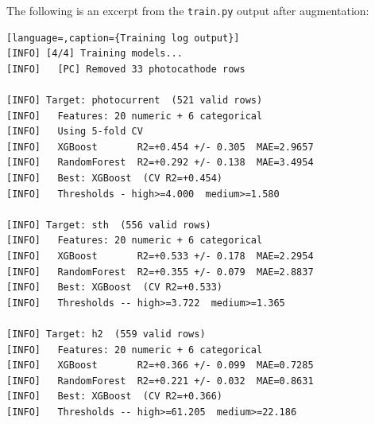 The following is an excerpt from the \texttt{train.py} output after augmentation:

\begin{lstlisting}[language=,caption={Training log output}]
[INFO] [4/4] Training models...
[INFO]   [PC] Removed 33 photocathode rows

[INFO] Target: photocurrent  (521 valid rows)
[INFO]   Features: 20 numeric + 6 categorical
[INFO]   Using 5-fold CV
[INFO]   XGBoost       R2=+0.454 +/- 0.305  MAE=2.9657
[INFO]   RandomForest  R2=+0.292 +/- 0.138  MAE=3.4954
[INFO]   Best: XGBoost  (CV R2=+0.454)
[INFO]   Thresholds - high>=4.000  medium>=1.580

[INFO] Target: sth  (556 valid rows)
[INFO]   Features: 20 numeric + 6 categorical
[INFO]   XGBoost       R2=+0.533 +/- 0.178  MAE=2.2954
[INFO]   RandomForest  R2=+0.355 +/- 0.079  MAE=2.8837
[INFO]   Best: XGBoost  (CV R2=+0.533)
[INFO]   Thresholds -- high>=3.722  medium>=1.365

[INFO] Target: h2  (559 valid rows)
[INFO]   Features: 20 numeric + 6 categorical
[INFO]   XGBoost       R2=+0.366 +/- 0.099  MAE=0.7285
[INFO]   RandomForest  R2=+0.221 +/- 0.032  MAE=0.8631
[INFO]   Best: XGBoost  (CV R2=+0.366)
[INFO]   Thresholds -- high>=61.205  medium>=22.186
\end{lstlisting}
